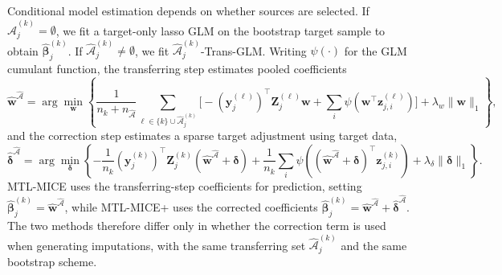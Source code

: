\documentclass[12pt]{article}
\begin{document}
Conditional model estimation depends on whether sources are selected. If $\widehat{\mathcal{A}}^{(k)}_j=\emptyset$, we fit a target-only lasso GLM on the bootstrap target sample to obtain $\hat{\bm{\beta}}^{(k)}_j$. If $\widehat{\mathcal{A}}^{(k)}_j\neq\emptyset$, we fit $\widehat{\mathcal{A}}^{(k)}_j$-Trans-GLM. Writing $\psi(\cdot)$ for the GLM cumulant function, the transferring step estimates pooled coefficients
\[
\hat{\bm{w}}^{\widehat{\mathcal{A}}}
=\arg\min_{\bm{w}}
\left\{
\frac{1}{n_k+n_{\widehat{\mathcal{A}}}}\sum_{\ell\in\{k\}\cup \widehat{\mathcal{A}}^{(k)}_j}
\Big[-(\bm{y}^{(\ell)}_j)^\top \bm{Z}^{(\ell)}_{j}\bm{w}
      + \sum_{i}\psi(\bm{w}^\top \bm{z}^{(\ell)}_{j,i})\Big]
+ \lambda_w\|\bm{w}\|_1
\right\},
\]
and the correction step estimates a sparse target adjustment using target data,
\[
\hat{\bm{\delta}}^{\widehat{\mathcal{A}}}
=\arg\min_{\bm{\delta}}
\left\{
-\frac{1}{n_k}(\bm{y}^{(k)}_j)^\top \bm{Z}^{(k)}_{j}(\hat{\bm{w}}^{\widehat{\mathcal{A}}}+\bm{\delta})
+\frac{1}{n_k}\sum_{i}\psi\!\left((\hat{\bm{w}}^{\widehat{\mathcal{A}}}+\bm{\delta})^\top \bm{z}^{(k)}_{j,i}\right)
+ \lambda_\delta\|\bm{\delta}\|_1
\right\}.
\]
MTL-MICE uses the transferring-step coefficients for prediction, setting $\hat{\bm{\beta}}^{(k)}_j=\hat{\bm{w}}^{\widehat{\mathcal{A}}}$, while MTL-MICE+ uses the corrected coefficients $\hat{\bm{\beta}}^{(k)}_j=\hat{\bm{w}}^{\widehat{\mathcal{A}}}+\hat{\bm{\delta}}^{\widehat{\mathcal{A}}}$. The two methods therefore differ only in whether the correction term is used when generating imputations, with the same transferring set $\widehat{\mathcal{A}}^{(k)}_j$ and the same bootstrap scheme.
\end{document}
